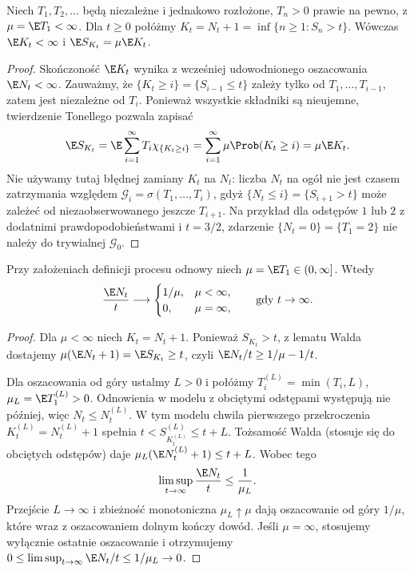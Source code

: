 \begin{lemat}
Niech $T_1,T_2,\ldots$ będą niezależne i jednakowo rozłożone,
$T_n>0$ prawie na pewno, z $\mu=\E T_1<\infty$.
Dla $t\ge0$ połóżmy $K_t=N_t+1=\inf\{n\ge1:S_n>t\}$.
Wówczas $\E K_t<\infty$ i
$\E S_{K_t}=\mu\E K_t$.
\end{lemat}
\begin{proof}
Skończoność $\E K_t$ wynika z wcześniej udowodnionego
oszacowania $\E N_t<\infty$. Zauważmy, że
$\{K_t\ge i\}=\{S_{i-1}\le t\}$ zależy tylko od
$T_1,\ldots,T_{i-1}$, zatem jest niezależne od $T_i$.
Ponieważ wszystkie składniki są nieujemne, twierdzenie Tonellego
pozwala zapisać
\[
\E S_{K_t}=\E\sum_{i=1}^\infty T_i\chi_{\{K_t\ge i\}}
=\sum_{i=1}^\infty\mu\Prob(K_t\ge i)
=\mu\E K_t.
\]
Nie używamy tutaj błędnej zamiany $K_t$ na $N_t$:
liczba $N_t$ na ogół nie jest czasem zatrzymania
względem $\mathcal G_i=\sigma(T_1,\ldots,T_i)$,
gdyż $\{N_t\le i\}=\{S_{i+1}>t\}$ może zależeć
od niezaobserwowanego jeszcze $T_{i+1}$.
Na przykład dla odstępów $1$ lub $2$ z dodatnimi
prawdopodobieństwami i $t=3/2$, zdarzenie
$\{N_t=0\}=\{T_1=2\}$ nie należy do trywialnej
$\mathcal G_0$.
\end{proof}

\begin{twierdzenie}
Przy założeniach definicji procesu odnowy niech
$\mu=\E T_1\in(0,\infty]$. Wtedy
\[
\frac{\E N_t}{t}\longrightarrow
\begin{cases}1/\mu,&\mu<\infty,\\0,&\mu=\infty,\end{cases}
\qquad\text{gdy }t\to\infty.
\]
\end{twierdzenie}
\begin{proof}
Dla $\mu<\infty$ niech $K_t=N_t+1$.
Ponieważ $S_{K_t}>t$, z lematu Walda dostajemy
$\mu(\E N_t+1)=\E S_{K_t}\ge t$,
czyli $\E N_t/t\ge1/\mu-1/t$.

Dla oszacowania od góry ustalmy $L>0$ i połóżmy
$T_i^{(L)}=\min(T_i,L)$, $\mu_L=\E T_1^{(L)}>0$.
Odnowienia w modelu z obciętymi odstępami występują
nie później, więc $N_t\le N_t^{(L)}$.
W tym modelu chwila pierwszego przekroczenia
$K_t^{(L)}=N_t^{(L)}+1$ spełnia
$t<S_{K_t^{(L)}}^{(L)}\le t+L$.
Tożsamość Walda (stosuje się do obciętych odstępów) daje
$\mu_L(\E N_t^{(L)}+1)\le t+L$. Wobec tego
\[
\limsup_{t\to\infty}\frac{\E N_t}{t}\le\frac{1}{\mu_L}.
\]
Przejście $L\to\infty$ i zbieżność monotoniczna
$\mu_L\uparrow\mu$ dają oszacowanie od góry $1/\mu$,
które wraz z oszacowaniem dolnym kończy dowód.
Jeśli $\mu=\infty$, stosujemy wyłącznie ostatnie
oszacowanie i otrzymujemy
$0\le\limsup_{t\to\infty}\E N_t/t\le1/\mu_L\to0$.
\end{proof}

